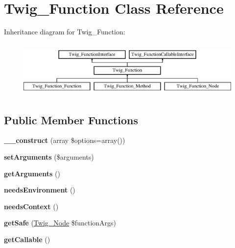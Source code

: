 \hypertarget{classTwig__Function}{}\section{Twig\+\_\+\+Function Class Reference}
\label{classTwig__Function}
Inheritance diagram for Twig\+\_\+\+Function\+:\begin{figure}[H]
\begin{center}
\leavevmode
\includegraphics[height=2.828283cm]{classTwig__Function}
\end{center}
\end{figure}
\subsection*{Public Member Functions}
\begin{DoxyCompactItemize}
\item 
{\bfseries \+\_\+\+\_\+construct} (array \$options=array())\hypertarget{classTwig__Function_af3378d5fddb198bd92949a9de476d66c}{}\label{classTwig__Function_af3378d5fddb198bd92949a9de476d66c}

\item 
{\bfseries set\+Arguments} (\$arguments)\hypertarget{classTwig__Function_a7d991cf94bec8f6ca2f7a7870ae3a045}{}\label{classTwig__Function_a7d991cf94bec8f6ca2f7a7870ae3a045}

\item 
{\bfseries get\+Arguments} ()\hypertarget{classTwig__Function_a9c39672ddef860cde5c799284878a349}{}\label{classTwig__Function_a9c39672ddef860cde5c799284878a349}

\item 
{\bfseries needs\+Environment} ()\hypertarget{classTwig__Function_a2466cfcac1e4ca07a281010ff5ac87dd}{}\label{classTwig__Function_a2466cfcac1e4ca07a281010ff5ac87dd}

\item 
{\bfseries needs\+Context} ()\hypertarget{classTwig__Function_a4890c813d08fd1a5c65267dab5c766c3}{}\label{classTwig__Function_a4890c813d08fd1a5c65267dab5c766c3}

\item 
{\bfseries get\+Safe} (\hyperlink{classTwig__Node}{Twig\+\_\+\+Node} \$function\+Args)\hypertarget{classTwig__Function_a659f137dc514cf821a820812cedd92b1}{}\label{classTwig__Function_a659f137dc514cf821a820812cedd92b1}

\item 
{\bfseries get\+Callable} ()\hypertarget{classTwig__Function_a885c19f0feff60c0670f160c024202ce}{}\label{classTwig__Function_a885c19f0feff60c0670f160c024202ce}

\end{DoxyCompactItemize}
